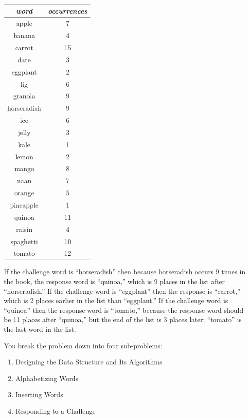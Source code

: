 \begin{center}
    \begin{tabular}{cc}
        \textit{word} & \textit{occurrences} \\ \hline
        apple       & 7 \\
        banana      & 4 \\
        carrot      & 15 \\
        date        & 3 \\
        eggplant    & 2 \\
        fig         & 6 \\
        granola     & 9 \\
        horseradish & 9 \\
        ice         & 6 \\
        jelly       & 3 \\
        kale        & 1 \\
        lemon       & 2 \\
        mango       & 8 \\
        naan        & 7 \\
        orange      & 5 \\
        pineapple   & 1 \\
        quinoa      & 11 \\
        raisin      & 4 \\
        spaghetti   & 10 \\
        tomato      & 12 \\
    \end{tabular}
\end{center}
If the challenge word is ``horseradish'' then because horseradish occurs 9 times in the book, the response word is ``quinoa,'' which is 9 places in the list after ``horseradish.''
If the challenge word is ``eggplant'' then the response is ``carrot,'' which is 2 places earlier in the list than ``eggplant.''
If the challenge word is ``quinoa'' then the response word is ``tomato,'' because the response word should be 11 places after ``quinoa,'' but the end of the list is 3 places later;
``tomato'' is the last word in the list.

You break the problem down into four sub-problems:

\begin{enumerate}
    \item Designing the Data Structure and Its Algorithms
    \item Alphabetizing Words
    \item Inserting Words
    \item Responding to a Challenge
\end{enumerate}

